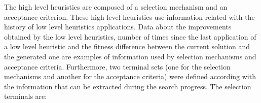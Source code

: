 \documentclass[conference]{IEEEtran}
\begin{document}







 The high level heuristics are composed of a selection mechanism and an acceptance criterion. These high level heuristics use information related with the history of low level heuristics applications. Data about the improvements obtained by the low level heuristics, number of times since the last application of a low level heuristic and the fitness difference between the current solution and the generated one are examples of information used by selection mechanisms and acceptance criteria.  Furthermore, two terminal sets (one for the selection mechanisms and another for the acceptance criteria) were defined according with the information that can be extracted during the search progress. The selection terminals are:

\end{document}
